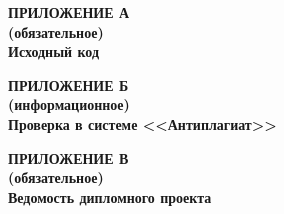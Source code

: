 \begin{center}
\textbf{
\MakeUppercase{Приложение А}\\
(обязательное)\\
Исходный код}
\end{center}



\newpage

\begin{center}
\textbf{
\MakeUppercase{Приложение Б}\\
(информационное)\\
Проверка в системе <<Антиплагиат>>}
\end{center}

\newpage
\pagestyle{empty}

\pagestyle{fancy}

\newpage


\begin{center}
\textbf{
\MakeUppercase{Приложение В}\\
(обязательное)\\
Ведомость дипломного проекта}
\end{center}

\newpage
\pagestyle{empty}

\pagestyle{fancy}